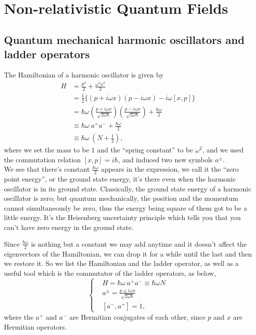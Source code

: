 \documentclass{article}
\newcommand{\be}{\begin{equation}}
\newcommand{\ee}{\end{equation}}
\renewcommand{\1}{\left}
\renewcommand{\2}{\right}
\newcommand{\om}{\omega}
\begin{document}
\newpage
\section{Non-relativistic Quantum Fields}
\subsection{Quantum mechanical harmonic oscillators and ladder operators}
The Hamiltonian of a harmonic oscillator is given by
\be\begin{split}
H&=\frac {p^2} 2 +\frac{ \om^2 x^2 }2\\
&=\frac 1 2 \bigg\{(p+i\om x)(p-i\om x)-i\om [x,p]\bigg\}\\
&=\hbar \om \1(\frac{p+i\om x}{\sqrt{2\om\hbar}}\2) \1(\frac{p-i\om x}{\sqrt{2\om\hbar}}\2) +\frac{\hbar\om} 2 \\
&\equiv \hbar\om\ a^+ a^- +\frac{\hbar\om} 2\\
&\equiv \hbar\om\ \1(N+\frac 1 2\2),
\end{split}\ee
where we set the mass to be $1$ and the ``spring constant'' to be $\om^2$, and we used the commutation relation $[x,p]=i\hbar$, and induced two new symbols $a^\pm$.\\
We see that there's constant $\frac{\hbar\om} 2$ appears in the expression, we call it the ``zero point energy'', or the ground state energy, it's there even when the harmonic oscillator is in its ground state. Classically, the ground state energy of a harmonic oscillator is zero; but quantum mechanically, the position and the momentum cannot simultaneously be zero, thus the energy being square of them got to be a little energy. It's the Heisenberg uncertainty principle which tells you that you can't have zero energy in the ground state.

Since $\frac{\hbar\om} 2$ is nothing but a constant we may add anytime and it doesn't affect the eigenvectors of the Hamiltonian, we can drop it for a while until the last and then we restore it. So we list the Hamiltonian and the ladder operator, as well as a useful tool which is the commutator of the ladder operators, as below,
\be\1\{\begin{split}
&H=\hbar\om\ a^+ a^-\equiv \hbar\om N\\
&a^\pm=\frac{p\pm i\om x}{\sqrt{2\om\hbar}}\\
&[a^-,a^+]=1,
\end{split}\2.\ee
where the $a^+$ and $a^-$ are Hermitian conjugates of each other, since $p$ and $x$ are Hermitian operators.
\end{document}
